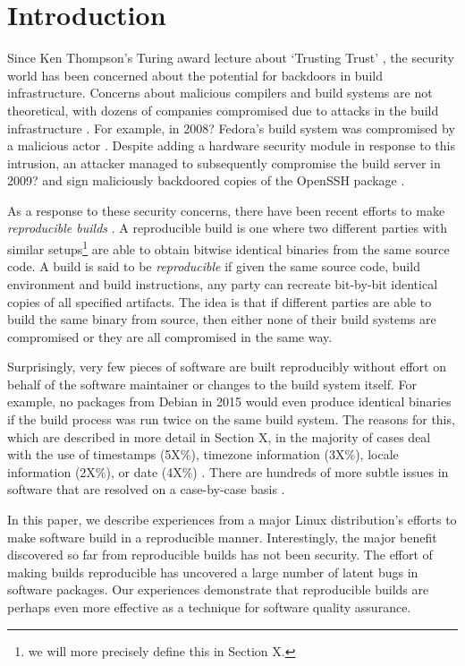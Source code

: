 \section{Introduction}
\label{SEC:introduction}

Since Ken Thompson's Turing award lecture about `Trusting Trust' 
, the security world has been concerned about the potential
for backdoors in build infrastructure.  Concerns about malicious compilers
and build systems are not
theoretical, with dozens of companies compromised due to attacks in the
build infrastructure .  For example, in 2008?
Fedora's build system was compromised by a malicious actor .
Despite adding a hardware security module in response to this intrusion, 
an attacker managed to subsequently compromise the build server in 2009? 
and sign maliciously backdoored copies of the OpenSSH package
.

As a response to these security concerns, there have been recent
efforts to make \emph{reproducible builds} .  A reproducible
build is one where two different parties with similar setups\footnote{we 
will more precisely define this in Section X.} are able 
to obtain bitwise identical binaries from the same source code.
A build is said to be \emph{reproducible} if given the same source code, build
environment and build instructions, any party can recreate bit-by-bit identical
copies of all specified artifacts.
The idea is that if different parties are able to build the same binary
from source, then either none of their build systems are compromised or
they are all compromised in the same way.

Surprisingly, very few pieces of software are built reproducibly without
effort on behalf of the software maintainer or changes to the build system
itself.  For example, no packages from Debian in 2015 would even
produce identical binaries if the build process was run twice on the same
build system.  The reasons for this, which are described in more detail
in Section X, in the majority of cases deal with the use
of timestamps (5X\%), timezone information (3X\%), locale information
(2X\%), or date (4X\%) .  There are hundreds of
more subtle issues in software that are resolved on a case-by-case basis
.

In this paper, we describe experiences from a major Linux distribution's
efforts to make software build in a reproducible manner.  Interestingly,
the major benefit discovered so far from reproducible builds has not been 
security.  The effort of making builds reproducible has uncovered a large
number of latent bugs in software packages.  Our experiences demonstrate
that reproducible builds are perhaps even more effective as a technique
for software quality assurance.


